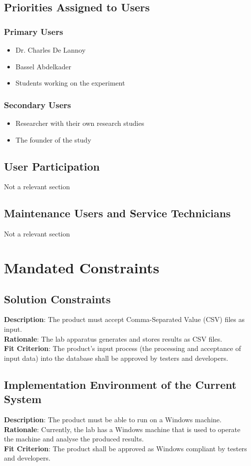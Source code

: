 \documentclass[12pt]{article}
\begin{document}
\subsection{Priorities Assigned to Users}
\subsubsection{Primary Users}
\begin{itemize}
  \item Dr. Charles De Lannoy
  \item Bassel Abdelkader
  \item Students working on the experiment 
\end{itemize}

\subsubsection{Secondary Users}
\begin{itemize}
  \item Researcher with their own research studies 
  \item The founder of the study
\end{itemize}
\subsection{User Participation}
Not a relevant section 
\subsection{Maintenance Users and Service Technicians}
Not a relevant section \section{Mandated Constraints}
\subsection{Solution Constraints}
\textbf{Description}: The product must accept Comma-Separated Value (CSV) files as input.\\
\textbf{Rationale}: The lab apparatus generates and stores results as CSV files.\\
\textbf{Fit Criterion}: The product's input process (the processing and acceptance of input data) into the database shall be approved by testers and developers.

\subsection{Implementation Environment of the Current System}
\textbf{Description}: The product must be able to run on a Windows machine.\\
\textbf{Rationale}: Currently, the lab has a Windows machine that is used to operate the machine and analyse the produced results.\\
\textbf{Fit Criterion}: The product shall be approved as Windows compliant by testers and developers.
\end{document}
